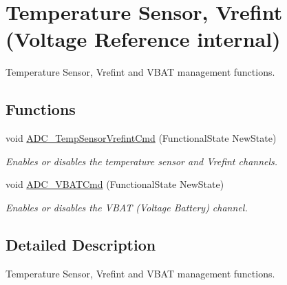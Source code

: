 \hypertarget{group___a_d_c___group3}{}\section{Temperature Sensor, Vrefint (Voltage Reference internal)}
\label{group___a_d_c___group3}


Temperature Sensor, Vrefint and V\+B\+AT management functions.  


\subsection*{Functions}
\begin{DoxyCompactItemize}
\item 
void \hyperlink{group___a_d_c___group3_ga848682e2d7d3de9f8cf03ffa4c11f0b5}{A\+D\+C\+\_\+\+Temp\+Sensor\+Vrefint\+Cmd} (Functional\+State New\+State)
\begin{DoxyCompactList}\small\item\em Enables or disables the temperature sensor and Vrefint channels. \end{DoxyCompactList}\item 
void \hyperlink{group___a_d_c___group3_ga17fc58510ddc80024e65d9738ad6e98c}{A\+D\+C\+\_\+\+V\+B\+A\+T\+Cmd} (Functional\+State New\+State)
\begin{DoxyCompactList}\small\item\em Enables or disables the V\+B\+AT (Voltage Battery) channel. \end{DoxyCompactList}\end{DoxyCompactItemize}


\subsection{Detailed Description}
Temperature Sensor, Vrefint and V\+B\+AT management functions. 

